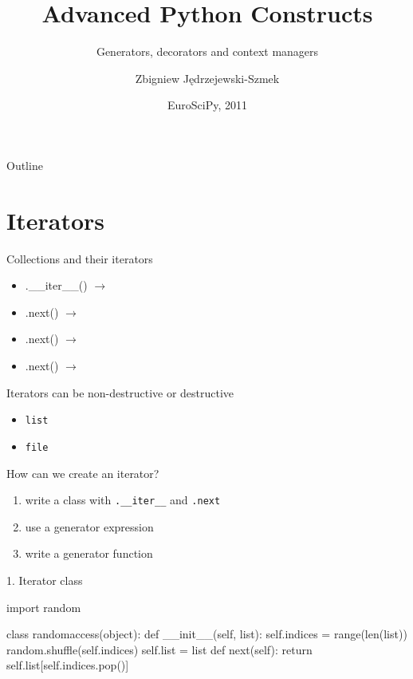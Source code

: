 \documentclass{beamer}
\title{Advanced Python Constructs}
\subtitle{Generators, decorators and context managers}
\author{Zbigniew Jędrzejewski-Szmek}
\date{EuroSciPy, 2011}
\newcommand{\lra}{\ensuremath{\longrightarrow}}
\begin{document}
\begin{frame}
  \titlepage
\end{frame}

\begin{frame}{Outline}
  \tableofcontents
\end{frame}

\section{Iterators}

\begin{frame}[fragile]{Collections and their iterators}
  \begin{itemize}
    \item
      \pause.\_\_iter\_\_() \pause \lra {}
      \pause
    \item
      .next() \lra {}
      \pause
    \item
      .next() \lra {}
      \pause
    \item
      .next() \lra {}
  \end{itemize}
\end{frame}

\begin{frame}{Iterators can be non-destructive or destructive}
  \begin{itemize}
    \item \texttt{list}
    \item \texttt{file}
  \end{itemize}
\end{frame}

\begin{frame}[fragile]{How can we create an iterator?}

  \begin{enumerate}[<+->]
    \item write a class with \verb|.__iter__| and \verb|.next|
    \item use a generator expression
    \item write a generator function
  \end{enumerate}
\end{frame}

\begin{frame}[fragile]{1. Iterator class}
  \begin{pycode}
    import random

    class randomaccess(object):
        def __init__(self, list):
            self.indices = range(len(list))
            random.shuffle(self.indices)
            self.list = list
        def next(self):
            return self.list[self.indices.pop()]
  \end{pycode}
\end{frame}
\end{document}
